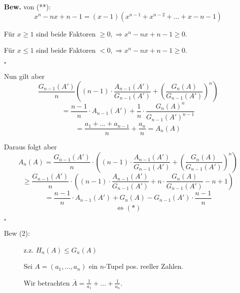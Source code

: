 \documentclass[12pt,a4paper,leqno]{article}
\begin{document}
\begin{description}
\begin{itemize}
          \textbf{Bew.} von (**): $$x ^ n - nx + n -1 = (x-1)(x ^{n-1} + x^{n-2}+...+x-n-1)$$
          
          
          Für $x \geq 1$ sind beide Faktoren $\geq 0, \Rightarrow x ^ n - nx + n - 1 \geq 0$.
          
          Für $x \leq 1$ sind beide Faktoren $< 0, \Rightarrow x ^ n - nx + n - 1 \geq 0$.
          \begin{flushright}$ \square $ \end{flushright}
          
          \newpage
          
          Nun gilt aber 
          $$\frac{G_{n-1}(A')}{n} \left( (n-1)\cdot  \frac{A_{n-1}(A')}{G_{n-1}(A')} + 
          \left( \frac{G_n(A)}{G_{n-1}(A')} \right) ^{\displaystyle n} \right)$$
          $$= \frac{n - 1}{n} \cdot A_{n-1}(A') + \frac{1}{n} \cdot \frac{G_n(A)^n}{G_{n-1}(A')^{n-1}}$$
          $$ = \frac{a_1 + ... + a_{n-1}}{n} + \frac{a_n}{n} = A_n(A)$$
          
          
          Daraus folgt aber
          $$A_n(A) = \frac{G_{n-1}(A')}{n} \cdot \left( (n-1) \cdot \frac{A_{n-1}(A')}{G_{n-1}(A')} + 
          \left( \frac{G_n(A)}{G_{n-1}(A')} \right) ^{\displaystyle n} \right) $$
          \reversemarginpar {}
          $$\geq  \frac{G_{n-1}(A')}{n}\cdot \left( (n-1) \cdot \frac{A_{n-1}(A')}{G_{n-1}(A')} + 
          n \cdot \frac{G_n(A)}{G_{n-1}(A')} - n + 1 \right)$$
          $$= \frac{n-1}{n} \cdot A_{n-1}(A') + G_n(A) - G_{n-1}(A')  \cdot   \frac{n-1}{n}$$
          $$ \Leftrightarrow (*)$$
          \begin{flushright}$\square$\end{flushright}
          
          
          \begin{description}
            \item[Bew (2):] z.z. $H_n(A) \leq G_n(A)$
              
              Sei $A=(a_1,\dotsc, a_n)$ ein $n$-Tupel pos. reeller Zahlen.
              
              Wir betrachten $\overline{A} = \frac{1}{a_1} + ... + \frac{1}{a_n}$. 
              

\end{description}
\end{itemize}
\end{description}
\end{document}
